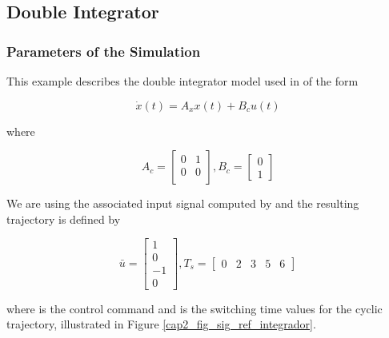 \subsection{Double Integrator}
\label{cap4_aplication_integrador}


\subsubsection{Parameters of the Simulation}

This example describes the double integrator model used in  of the form

\begin{equation}
    \dot{x}(t) = A_x x(t) + B_c u(t)
\end{equation}

\noindent
where

\begin{equation}
    \label{cap4_eq_dynamics_integrador}
    A_c = \left[
        \begin{matrix}
            0 & 1 \\
            0 & 0 \\
        \end{matrix}
    \right],
    B_c = \left[
        \begin{matrix}
            0 \\
            1
        \end{matrix}
    \right]
\end{equation}

We are using the associated input signal computed by  and 
the resulting trajectory is defined by

\begin{equation}
    \label{cap4_eq_signal_integrador}
    \bar{u} = \left[
        \begin{matrix}
            1 \\
            0 \\
            -1 \\
            0
        \end{matrix}
    \right],
    T_s = \left[
        \begin{matrix}
            0 &
            2 &
            3 &
            5 &
            6
        \end{matrix}
    \right]
\end{equation}

\noindent
where  is the control command and  is the switching time values for the cyclic trajectory,
illustrated in Figure \ref{cap2_fig_sig_ref_integrador}.

